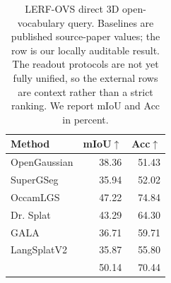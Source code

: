 \begin{table}[t]
  \centering
  \caption{LERF-OVS direct 3D open-vocabulary query. Baselines are published source-paper values; the \method{} row is our locally auditable result. The readout protocols are not yet fully unified, so the external rows are context rather than a strict ranking. We report mIoU and Acc in percent.}
  \label{tab:lerf-direct-3d-selection}
  \footnotesize
  \setlength{\tabcolsep}{3.5pt}
  \begin{tabular}{lrr}
    \toprule
    Method & mIoU$\uparrow$ & Acc$\uparrow$ \\
    \midrule
    OpenGaussian & 38.36 & 51.43 \\
    SuperGSeg & 35.94 & 52.02 \\
    OccamLGS & 47.22 & 74.84 \\
    Dr. Splat & 43.29 & 64.30 \\
    GALA & 36.71 & 59.71 \\
    LangSplatV2 & 35.87 & 55.80 \\
    \method{} & 50.14 & 70.44 \\
    \bottomrule
  \end{tabular}
\end{table}
